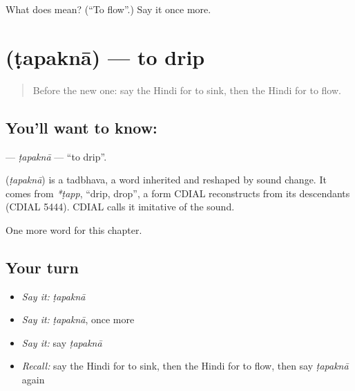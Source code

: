 \begin{tcolorbox}[breakable,colback=teal!4,colframe=teal!35!black,title={Before you move on}]
What does  mean? (\textquotedblleft{}To flow\textquotedblright{}.) Say it once more.
\end{tcolorbox}
\section[\texorpdfstring{\hi{टपकना} (ṭapaknā)}{टपकना (ṭapaknā)}]{ (ṭapaknā) — to drip}

\label{lesson:HI-C231-tapakna}



\begin{quote}
Before the new one: say the Hindi for to sink, then the Hindi for to flow.
\end{quote}

\subsection*{You'll want to know: }
\textbf{} — \emph{ṭapaknā} — \textquotedblleft{}to drip\textquotedblright{}.

\begin{cousinweb}
\textbf{} (\emph{ṭapaknā}) is a tadbhava, a word inherited and reshaped by sound change. It comes from \emph{*ṭapp}, \textquotedblleft{}drip, drop\textquotedblright{}, a form CDIAL reconstructs from its descendants (CDIAL 5444). CDIAL calls it imitative of the sound.
\end{cousinweb}

\begin{grammarlens}[title={What you've built}]
One more word for this chapter.
\end{grammarlens}

\subsection*{Your turn}
\begin{itemize}
\raggedright
  \item \emph{Say it:} \emph{ṭapaknā}
  \item \emph{Say it:} \emph{ṭapaknā}, once more
  \item \emph{Say it:} say \emph{ṭapaknā}
  \item \emph{Recall:} say the Hindi for to sink, then the Hindi for to flow, then say \emph{ṭapaknā} again
\end{itemize}

